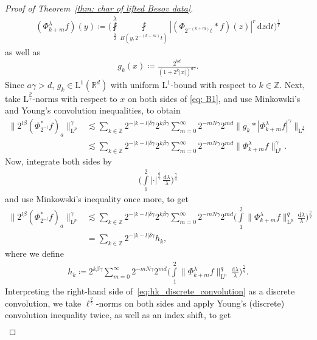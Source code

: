 \documentclass[11pt, leqno,parskip=half]{amsart}
\theoremstyle{definition}
\newcommand{\IR}{\mathbb{R}}
\newcommand{\IZ}{\mathbb{Z}}
\renewcommand{\L}{\mathrm{L}}
\renewcommand{\d}{\mathrm{d}}
\numberwithin{equation}{section}
\begin{document}
\begin{proof}[Proof of Theorem~\ref{thm: char of lifted Besov data}]
\begin{align*}
    (\Phi^\lambda_{k+m}f)(y) \coloneqq \bigg(\fint\limits_{\frac{\lambda}{2}}^\lambda \fint\limits_{B(y,2^{-(k+m)}t)} |(\Phi_{2^{-(k+m)}t}\ast f)(z) |^r\,\d z \d t\bigg)^\frac{1}{r}
\end{align*}
as well as
\begin{align*}
    g_k(x) \coloneqq \frac{2^{kd}}{(1+2^k|x|)^{a\gamma}}.
\end{align*}
Since $a\gamma >d$, $g_k\in \L^1(\IR^d)$ with uniform $\L^1$-bound with respect to $k\in\IZ$. Next, take $\L^{\frac{p}{\gamma}}$-norms with respect to $x$ on both sides of \eqref{eq: B1}, and use
Minkowski's and Young's convolution inequalities, to obtain
\begin{align*}
   \|2^{l\beta}(\Phi_{2^{-l}}^*f)_a\|_{\L^p}^\gamma &\lesssim\sum\limits_{k\in\IZ} 2^{-|k-l|\delta\gamma} 2^{k\beta\gamma} \sum\limits_{m=0}^\infty 2^{-mN\gamma} 2^{md} \|g_k\ast|\Phi^\lambda_{k+m}f|^\gamma\|_{\L^\frac{p}{\gamma}}\\
   &\lesssim\sum\limits_{k\in\IZ} 2^{-|k-l|\delta\gamma} 2^{k\beta\gamma} \sum\limits_{m=0}^\infty 2^{-mN\gamma} 2^{md} \|\Phi^\lambda_{k+m}f\|^\gamma_{\L^p}.
\end{align*}
Now, integrate both sides by
\begin{align*}
    \bigg(\int\limits_1^2|\cdot |^\frac{q}{\gamma}\,\frac{\d \lambda}{\lambda}\bigg)^\frac{\gamma}{q}
\end{align*}
and use Minkowski's inequality once more, to get
\begin{align}
    \label{eq:hk_discrete_convolution}
   \|2^{l\beta}(\Phi_{2^{-l}}^*f)_a\|_{\L^p}^\gamma &\lesssim\sum\limits_{k\in\IZ} 2^{-|k-l|\delta\gamma} 2^{k\beta\gamma} \sum\limits_{m=0}^\infty 2^{-mN\gamma} 2^{md} \bigg(\int\limits_1^2\|\Phi^\lambda_{k+m}f\|^q_{\L^p}\,\frac{\d \lambda}{\lambda}\bigg)^\frac{\gamma}{q} \\
   &=\sum\limits_{k\in\IZ} 2^{-|k-l|\delta\gamma} h_k, \nonumber
\end{align}
where we define
\begin{align*}
    h_k \coloneqq 2^{k\beta\gamma} \sum\limits_{m=0}^\infty 2^{-mN\gamma} 2^{md} \bigg(\int\limits_1^2\|\Phi^\lambda_{k+m}f\|^q_{\L^p}\,\frac{\d \lambda}{\lambda}\bigg)^\frac{\gamma}{q}.
\end{align*}
Interpreting the right-hand side of~\eqref{eq:hk_discrete_convolution} as a discrete convolution, we take $\ell^\frac{q}{\gamma}$-norms on both sides and apply Young's (discrete) convolution inequality twice, as well as an index shift, to get
\begin{align*}

\end{align*}
\end{proof}
\end{document}
